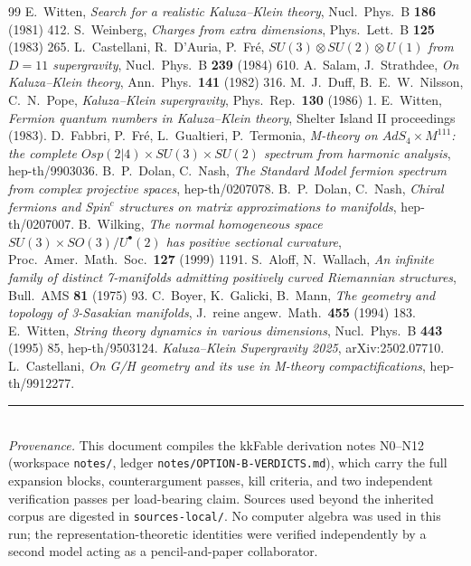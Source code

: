 \documentclass[11pt]{article}
\begin{document}
\begin{thebibliography}{99}
 E.~Witten, \emph{Search for a realistic Kaluza--Klein theory},
Nucl.\ Phys.\ B \textbf{186} (1981) 412.
 S.~Weinberg, \emph{Charges from extra dimensions},
Phys.\ Lett.\ B \textbf{125} (1983) 265.
 L.~Castellani, R.~D'Auria, P.~Fr\'e,
\emph{$SU(3)\otimes SU(2)\otimes U(1)$ from $D=11$ supergravity},
Nucl.\ Phys.\ B \textbf{239} (1984) 610.
 A.~Salam, J.~Strathdee, \emph{On Kaluza--Klein theory},
Ann.\ Phys.\ \textbf{141} (1982) 316.
 M.~J.~Duff, B.~E.~W.~Nilsson, C.~N.~Pope, \emph{Kaluza--Klein supergravity},
Phys.\ Rep.\ \textbf{130} (1986) 1.
 E.~Witten, \emph{Fermion quantum numbers in Kaluza--Klein theory},
Shelter Island II proceedings (1983).
 D.~Fabbri, P.~Fr\'e, L.~Gualtieri, P.~Termonia,
\emph{M-theory on $AdS_4\times M^{111}$: the complete $Osp(2|4)\times SU(3)\times SU(2)$
spectrum from harmonic analysis}, hep-th/9903036.
 B.~P.~Dolan, C.~Nash,
\emph{The Standard Model fermion spectrum from complex projective spaces}, hep-th/0207078.
 B.~P.~Dolan, C.~Nash,
\emph{Chiral fermions and Spin$^c$ structures on matrix approximations to manifolds},
hep-th/0207007.
 B.~Wilking, \emph{The normal homogeneous space $SU(3)\times SO(3)/U^\bullet(2)$
has positive sectional curvature}, Proc.\ Amer.\ Math.\ Soc.\ \textbf{127} (1999) 1191.
 S.~Aloff, N.~Wallach, \emph{An infinite family of distinct 7-manifolds
admitting positively curved Riemannian structures}, Bull.\ AMS \textbf{81} (1975) 93.
 C.~Boyer, K.~Galicki, B.~Mann, \emph{The geometry and topology of
3-Sasakian manifolds}, J.\ reine angew.\ Math.\ \textbf{455} (1994) 183.
 E.~Witten, \emph{String theory dynamics in various dimensions},
Nucl.\ Phys.\ B \textbf{443} (1995) 85, hep-th/9503124.
 \emph{Kaluza--Klein Supergravity 2025}, arXiv:2502.07710.
 L.~Castellani, \emph{On G/H geometry and its use in M-theory
compactifications}, hep-th/9912277.
\end{thebibliography}

\vspace{1em}
\noindent\rule{\textwidth}{0.4pt}\\
{\small\emph{Provenance.} This document compiles the kkFable derivation notes
N0--N12 (workspace \texttt{notes/}, ledger \texttt{notes/OPTION-B-VERDICTS.md}), which carry
the full expansion blocks, counterargument passes, kill criteria, and two independent
verification passes per load-bearing claim. Sources used beyond the inherited corpus are
digested in \texttt{sources-local/}. No computer algebra was used in this run; the
representation-theoretic identities were verified independently by a second model acting as
a pencil-and-paper collaborator.}
\end{document}
